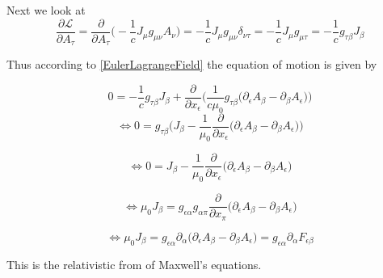 \documentclass{article}
\begin{document}
Next we look at
\begin{equation}
    \frac{\partial \mathcal{L}}{\partial A_\tau}
    = \frac{\partial }{\partial A_\tau} \bigg( - \frac{1}{c} J_\mu g_{\mu\nu} A_\nu \bigg)
    = - \frac{1}{c} J_\mu g_{\mu\nu} \delta_{\nu\tau}
    = - \frac{1}{c} J_\mu g_{\mu\tau}
    = - \frac{1}{c} g_{\tau\beta} J_\beta
\end{equation}

Thus according to \ref{EulerLagrangeField} the equation of motion is given by

\begin{equation}
     0 = - \frac{1}{c} g_{\tau\beta} J_\beta
          + \frac{\partial}{\partial x_\epsilon}
            \bigg(
                \frac{1}{c \mu_0} g_{\tau\beta}
                \bigg(
                \partial_\epsilon A_\beta - \partial_\beta A_\epsilon
                \bigg)
            \bigg)
\end{equation}
\begin{equation}
    \iff 0 = g_{\tau\beta} \bigg(J_\beta
             - \frac{1}{\mu_0}  \frac{\partial}{\partial x_\epsilon}\big( \partial_\epsilon A_\beta - \partial_\beta A_\epsilon \big) \bigg)
\end{equation}

\begin{equation}
    \iff 0 = J_\beta - \frac{1}{\mu_0}  \frac{\partial}{\partial x_\epsilon}\big( \partial_\epsilon A_\beta - \partial_\beta A_\epsilon \big)
\end{equation}

\begin{equation}
    \iff \mu_0 J_\beta = g_{\epsilon\alpha}g_{\alpha\pi}\frac{\partial}{\partial x_\pi}\big( \partial_\epsilon A_\beta - \partial_\beta A_\epsilon \big)
\end{equation}

\begin{equation} \label{equationOfMotionUntransformed}
    \iff \mu_0 J_\beta = g_{\epsilon\alpha}  \partial_\alpha \big(\partial_\epsilon A_\beta - \partial_\beta A_\epsilon \big)
                       = g_{\epsilon\alpha}  \partial_\alpha F_{\epsilon\beta}
\end{equation}

This is the relativistic from of Maxwell's equations.
\end{document}
